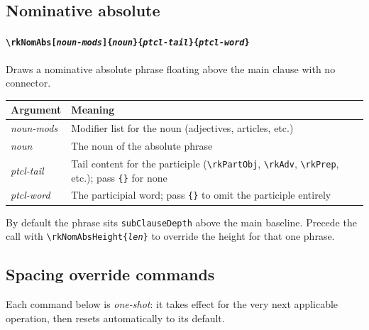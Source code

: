 \documentclass[11pt]{article}
\newcommand{\cmd}[1]{\texttt{\textbackslash #1}}
\newcommand{\opt}[1]{\texttt{#1}}
\begin{document}
\subsection*{Nominative absolute}

\paragraph{\cmd{rkNomAbs[\textit{noun-mods}]\{\textit{noun}\}\{\textit{ptcl-tail}\}\{\textit{ptcl-word}\}}}
Draws a nominative absolute phrase floating above the main clause with no
connector.

\medskip
\begin{tabular}{@{}p{3.5cm}p{11.5cm}@{}}
  \toprule
  Argument & Meaning \\
  \midrule
  \textit{noun-mods}  & Modifier list for the noun (adjectives, articles, etc.) \\
  \textit{noun}       & The noun of the absolute phrase \\
  \textit{ptcl-tail}  & Tail content for the participle (\cmd{rkPartObj}, \cmd{rkAdv}, \cmd{rkPrep}, etc.); pass \texttt{\{\}} for none \\
  \textit{ptcl-word}  & The participial word; pass \texttt{\{\}} to omit the participle entirely \\
  \bottomrule
\end{tabular}

\medskip\noindent
By default the phrase sits \opt{subClauseDepth} above the main baseline.
Precede the call with \cmd{rkNomAbsHeight\{\textit{len}\}} to override the
height for that one phrase.

\subsection*{Spacing override commands}

Each command below is \emph{one-shot}: it takes effect for the very next
applicable operation, then resets automatically to its default.
\end{document}

